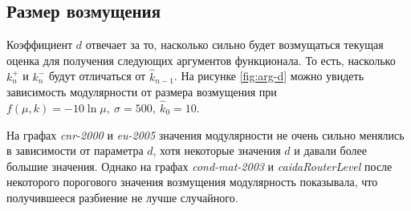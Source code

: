 
\subsection{Размер возмущения}

Коэффициент $d$ отвечает за то, насколько сильно будет возмущаться текущая оценка для получения следующих аргументов функционала. То есть, насколько $k_n^{+}$ и $k_n^{-}$ будут отличаться от $\hat{k}_{n - 1}$. На рисунке \ref{fig:arg-d} можно увидеть зависимость модулярности от размера возмущения при $f(\mu, k) = -10 \ln \mu,\ \sigma = 500,\ \hat{k}_0 = 10$.

На графах \emph{cnr-2000} и \emph{eu-2005} значения модулярности не очень сильно менялись в зависимости от параметра $d$, хотя некоторые значения $d$ и давали более большие значения. Однако на графах \emph{cond-mat-2003} и \emph{caidaRouterLevel} после некоторого порогового значения возмущения модулярность показывала, что получившееся разбиение не лучше случайного.

